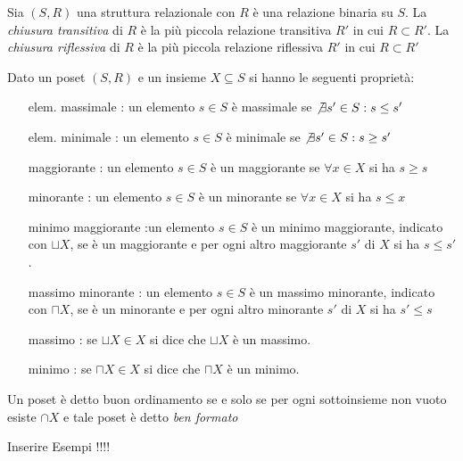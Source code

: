 Sia $(S,R)$ una struttura relazionale con $R$ è una relazione binaria su $S$.
La \emph{chiusura transitiva} di $R$ è la più piccola relazione transitiva $R'$ in cui $R \subset R'$.
La \emph{chiusura riflessiva} di $R$ è la più piccola relazione riflessiva $R'$ in cui $R \subset R'$

\begin{prop}
Dato un poset $(S,R)$ e un insieme $X \subseteq S$ si hanno le seguenti proprietà:
\end{prop}
\begin{enumerate}
    \item[elem. massimale]: un elemento $s \in S$ è massimale se $\not \exists s' \in S : s \leq s'$
    \item[elem. minimale]: un elemento $s \in S$ è minimale se $\not \exists s' \in S : s \geq s'$
    \item[maggiorante]: un elemento $s \in S$ è un maggiorante se $\forall x \in X$ si ha $s \geq s$
    \item[minorante]: un elemento $s \in S$ è un minorante se $\forall x \in X$ si ha $s \leq x$
    \item[minimo maggiorante]:un elemento $s \in S$ è un minimo maggiorante, indicato con $\sqcup X$,
          se è un maggiorante e per ogni altro maggiorante $s'$ di $X$ si ha $s \leq s'$.
    \item[massimo minorante]: un elemento $s \in S$ è un massimo minorante, indicato con $\sqcap X$,
          se è un minorante e per ogni altro minorante $s'$ di $X$ si ha $s' \leq s$
    \item[massimo]: se $\sqcup X \in X$ si dice che $\sqcup X$ è un massimo.
    \item[minimo]: se $\sqcap X \in X$ si dice che $\sqcap X$ è un minimo.
\end{enumerate}

\begin{defi}
    Un poset è detto buon ordinamento se e solo se per ogni sottoinsieme non vuoto esiste
    $\cap X$ e tale poset è detto \emph{ben formato}
\end{defi}

Inserire Esempi !!!!
